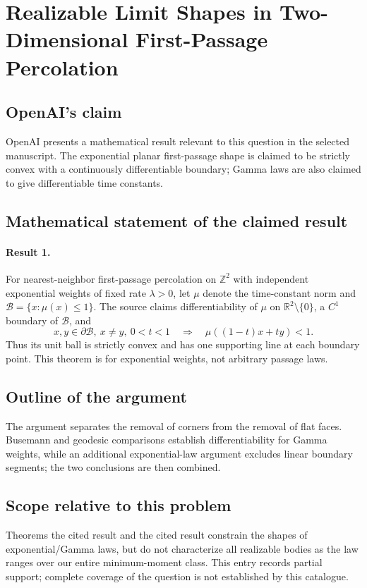 \documentclass[11pt]{article}
\begin{document}
\section*{Realizable Limit Shapes in Two-Dimensional First-Passage Percolation}

\subsection{OpenAI's claim}
OpenAI presents a mathematical result relevant to this question in the selected manuscript. The exponential planar first-passage shape is claimed to be strictly convex with a continuously differentiable boundary; Gamma laws are also claimed to give differentiable time constants.

\subsection{Mathematical statement of the claimed result}
\paragraph{Result 1.} For nearest-neighbor first-passage percolation on \(\mathbb Z^2\) with independent exponential weights of fixed rate \(\lambda>0\), let \(\mu\) denote the time-constant norm and \(\mathcal B=\{x:\mu(x)\le1\}\). The source claims differentiability of \(\mu\) on \(\mathbb R^2\setminus\{0\}\), a \(C^1\) boundary of \(\mathcal B\), and
\[
 x,y\in\partial\mathcal B,\ x\ne y,\ 0<t<1
 \quad\Longrightarrow\quad\mu((1-t)x+ty)<1.
\]
Thus its unit ball is strictly convex and has one supporting line at each boundary point. This theorem is for exponential weights, not arbitrary passage laws.

\subsection{Outline of the argument}
The argument separates the removal of corners from the removal of flat faces. Busemann and geodesic comparisons establish differentiability for Gamma weights, while an additional exponential-law argument excludes linear boundary segments; the two conclusions are then combined.

\subsection{Scope relative to this problem}
Theorems the cited result and the cited result constrain the shapes of exponential/Gamma laws, but do not characterize all realizable bodies as the law ranges over our entire minimum-moment class. This entry records partial support; complete coverage of the question is not established by this catalogue.
\end{document}
